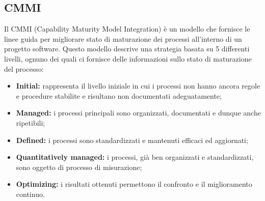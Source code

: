 \subsection{CMMI}
Il CMMI (Capability Maturity Model Integration) è un modello che fornisce le linee guida per migliorare stato di maturazione dei processi all'interno di un progetto software.
Questo modello descrive una strategia basata su 5 differenti livelli, ognuno dei quali ci fornisce delle informazioni sullo stato di maturazione del processo:
\begin{itemize}
	\item \textbf{Initial:} rappresenta il livello iniziale in cui i processi non hanno ancora regole e procedure stabilite e risultano non documentati adeguatamente;
	\item \textbf{Managed:} i processi principali sono organizzati, documentati e dunque anche ripetibili;
	\item \textbf{Defined:} i processi sono standardizzati e mantenuti efficaci ed aggiornati;
	\item \textbf{Quantitatively managed:} i processi, già ben organizzati e standardizzati, sono oggetto di processo di misurazione;
	\item \textbf{Optimizing:} i risultati ottenuti permettono il confronto e il miglioramento continuo. 
\end{itemize}